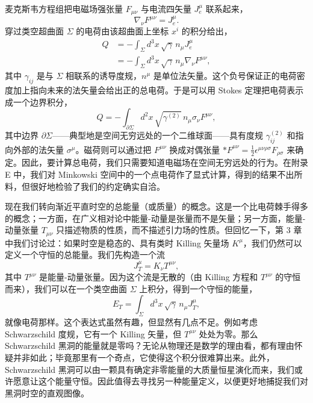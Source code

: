 麦克斯韦方程组把电磁场强张量 $F_{\mu\nu}$ 与电流四矢量 $J^{\mu}_{e}$ 联系起来，
\begin{equation*}
\nabla_\nu F^{\mu\nu} = J^{\mu}_{e}.
\tag{6.25}
\end{equation*}
穿过类空超曲面 $\Sigma$ 的电荷由该超曲面上坐标 $x^{i}$ 的积分给出，
\begin{align*}
Q &= -\int_{\Sigma} d^{3}x\,\sqrt{\gamma}\, n_\mu J^{\mu}_{e}\\
  &= -\int_{\Sigma} d^{3}x\,\sqrt{\gamma}\, n_\mu\nabla_\nu F^{\mu\nu},
\tag{6.26}
\end{align*}
其中 $\gamma_{ij}$ 是与 $\Sigma$ 相联系的诱导度规，$n^{\mu}$ 是单位法矢量。这个负号保证正的电荷密度加上指向未来的法矢量会给出正的总电荷。于是可以用 Stokes 定理把电荷表示成一个边界积分，
\begin{equation*}
Q = -\int_{\partial\Sigma} d^{2}x\,\sqrt{\gamma^{(2)}}\, n_\mu\sigma_\nu F^{\mu\nu},
\tag{6.27}
\end{equation*}
其中边界 $\partial\Sigma$——典型地是空间无穷远处的一个二维球面——具有度规 $\gamma^{(2)}_{ij}$ 和指向外部的法矢量 $\sigma^{\mu}$。磁荷则可以通过把 $F^{\mu\nu}$ 换成对偶张量 ${*F}^{\mu\nu}=\frac{1}{2}\epsilon^{\mu\nu\rho\sigma}F_{\rho\sigma}$ 来确定。因此，要计算总电荷，我们只需要知道电磁场在空间无穷远处的行为。在附录 E 中，我们对 Minkowski 空间中的一个点电荷作了显式计算，得到的结果不出所料，但很好地检验了我们的约定确实自洽。

现在我们转向渐近平直时空的总能量（或质量）的概念。这是一个比电荷棘手得多的概念；一方面，在广义相对论中能量-动量是张量而不是矢量；另一方面，能量-动量张量 $T_{\mu\nu}$ 只描述物质的性质，而不描述引力场的性质。但回忆一下，第 3 章中我们讨论过：如果时空是稳态的、具有类时 Killing 矢量场 $K^{\mu}$，我们仍然可以定义一个守恒的总能量。我们先构造一个流
\begin{equation*}
J^{\mu}_{T} = K_\nu T^{\mu\nu},
\tag{6.28}
\end{equation*}
其中 $T^{\mu\nu}$ 是能量-动量张量。因为这个流是无散的（由 Killing 方程和 $T^{\mu\nu}$ 的守恒而来），我们可以在一个类空曲面 $\Sigma$ 上积分，得到一个守恒的能量，
\begin{equation*}
E_{T} = \int_{\Sigma} d^{3}x\,\sqrt{\gamma}\, n_\mu J^{\mu}_{T},
\tag{6.29}
\end{equation*}
就像电荷那样。这个表达式虽然有趣，但显然有几点不足。例如考虑 Schwarzschild 度规，它有一个
Killing 矢量，但 $T^{\mu\nu}$ 处处为零。那么 Schwarzschild 黑洞的能量就是零吗？无论从物理还是数学的理由看，都有理由怀疑并非如此；毕竟那里有一个奇点，它使得这个积分很难算出来。此外，Schwarzschild 黑洞可以由一颗具有确定非零能量的大质量恒星演化而来，我们或许愿意让这个能量守恒。因此值得去寻找另一种能量定义，以便更好地捕捉我们对黑洞时空的直观图像。

